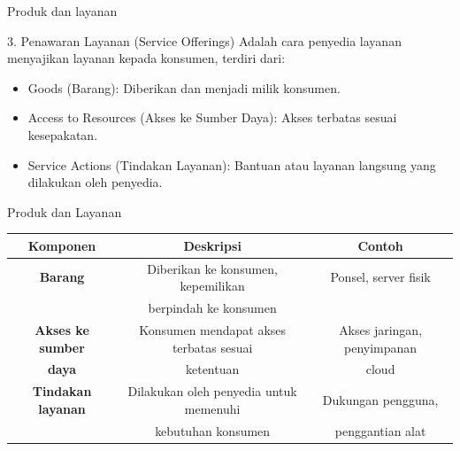 \documentclass[aspectratio=179]{beamer}
\begin{document}
\begin{frame}{Produk dan layanan}
    \begin{block}{3. Penawaran Layanan (Service Offerings)}
    {Adalah cara penyedia layanan menyajikan layanan kepada konsumen, terdiri dari:}
        \begin{itemize}
            \item Goods (Barang): Diberikan dan menjadi milik konsumen.
            \item Access to Resources (Akses ke Sumber Daya): Akses terbatas sesuai kesepakatan.
            \item Service Actions (Tindakan Layanan): Bantuan atau layanan langsung yang dilakukan oleh penyedia.
        \end{itemize}
    \end{block}
\end{frame}

\begin{frame}{Produk dan Layanan}
    \begin{tabular}{|c|c|c|}
    \hline
        \textbf{Komponen} & \textbf{Deskripsi} & \textbf{Contoh} \\ \hline
        \textbf{Barang} & Diberikan ke konsumen, kepemilikan & Ponsel, server fisik \\ &  berpindah ke konsumen &  \\ \hline
        \textbf{Akses ke sumber} & Konsumen mendapat akses terbatas sesuai & Akses jaringan, penyimpanan \\ \textbf{daya}& ketentuan & cloud \\ \hline
        \textbf{Tindakan layanan} & Dilakukan oleh penyedia untuk memenuhi & Dukungan pengguna, \\ & kebutuhan konsumen& penggantian alat\\ \hline
    \end{tabular}
\end{frame}
\end{document}
